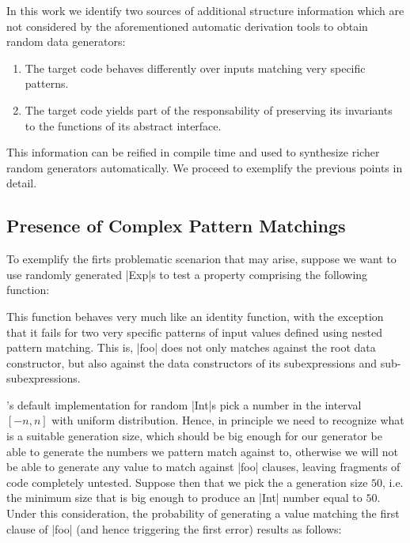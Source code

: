 In this work we identify two sources of additional structure information which
are not considered by the aforementioned automatic derivation tools to obtain
random data generators:

\begin{enumerate}
\item The target code behaves differently over inputs matching very specific
  patterns.
\item The target code yields part of the responsability of preserving its
  invariants to the functions of its abstract interface.
\end{enumerate}

This information can be reified in compile time and used to synthesize richer
random generators automatically. We proceed to exemplify the previous points in
detail.

\subsection{\textbf{Presence of Complex Pattern Matchings}}

To exemplify the firts problematic scenarion that may arise, suppose we want to
use randomly generated |Exp|s to test a property comprising the following
function:


This function behaves very much like an identity function, with the exception
that it fails for two very specific patterns of input values defined using
nested pattern matching.
%
This is, |foo| does not only matches against the root data constructor, but also
against the data constructors of its subexpressions and sub-subexpressions.


\quickcheck's default implementation for random |Int|s pick a number in the
interval $[-n, n]$ with uniform distribution.
%
Hence, in principle we need to recognize what is a suitable generation size,
which should be big enough for our generator be able to generate the numbers we
pattern match against to, otherwise we will not be able to generate any value to
match against |foo| clauses, leaving fragments of code completely untested.
%
Suppose then that we pick the a generation size $50$, i.e. the minimum size that
is big enough to produce an |Int| number equal to $50$.
%
Under this consideration, the probability of generating a value matching the
first clause of |foo| (and hence triggering the first error) results as follows:

